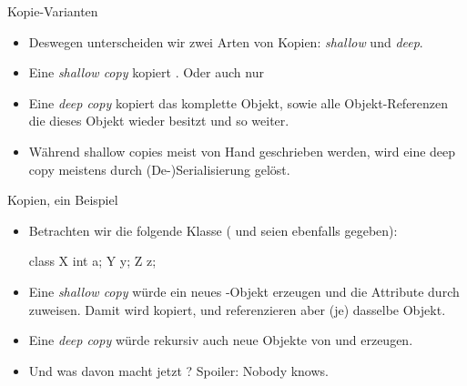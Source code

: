 {\begin{frame}[t,fragile]{Kopie-Varianten}
    \begin{itemize}[<+(1)->]
        \itemsep10pt
        \item Deswegen unterscheiden wir zwei Arten von Kopien: \textit{shallow} und \textit{deep}.
        \item Eine \textit{shallow copy} kopiert . Oder auch nur 
        \item Eine \textit{deep copy} kopiert das komplette Objekt, sowie alle Objekt-Referenzen die dieses Objekt wieder besitzt und so weiter.
        \item Während shallow copies meist von Hand geschrieben werden,\pause{} wird eine deep copy meistens durch (De-)Serialisierung gelöst.\pause{}
    \end{itemize}
\end{frame}

{
\begin{frame}[t,fragile]{Kopien, ein Beispiel}
    \begin{itemize}[<+(1)->]
        \item Betrachten wir die folgende Klasse ( und  seien ebenfalls gegeben):\pause
\begin{plainjava}
class X {
    int a;
    Y y;
    Z z;
}
\end{plainjava}
        \item Eine \textit{shallow copy} würde ein neues -Objekt erzeugen und die Attribute durch \say{\bjava{=}} zuweisen.\pause{} Damit wird  kopiert,  und  referenzieren aber (je) dasselbe Objekt.
        \item Eine \textit{deep copy} würde rekursiv auch neue Objekte von  und  erzeugen.\pause{} 
        \item Und was davon macht jetzt ?\pause{} Spoiler: Nobody knows.
    \end{itemize}
\end{frame}
}

}
